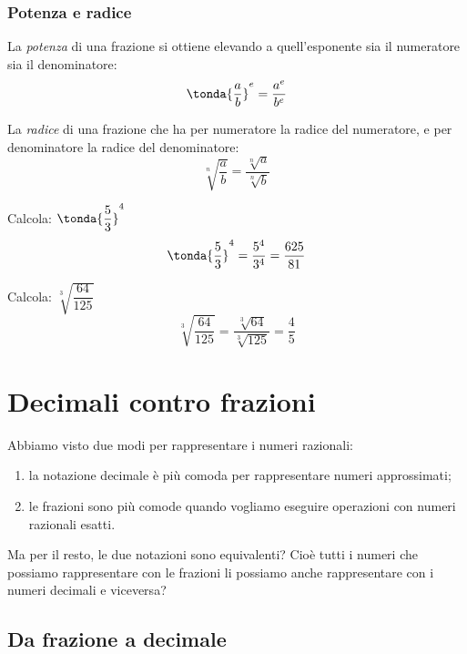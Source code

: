 \subsubsection{Potenza e radice}

\begin{definizione}
 La \emph{potenza} di una frazione si ottiene elevando a quell'esponente
sia il numeratore sia il denominatore:
\[\tonda{\dfrac{a}{b}}^e = \dfrac{a^e}{b^e}\]
\end{definizione}

\begin{definizione}
 La \emph{radice} di una frazione che ha per numeratore la radice del
numeratore, e per denominatore la radice del denominatore:
\[\sqrt[n]{\dfrac{a}{b}} = \dfrac{\sqrt[n]{a}}{\sqrt[n]{b}}\]
\end{definizione}

\begin{esempio}
Calcola: \(\tonda{\dfrac{5}{3}}^4\)
\[\tonda{\dfrac{5}{3}}^4 = \dfrac{5^4}{3^4} = \dfrac{625}{81}\]
\end{esempio}

\begin{esempio}
Calcola: \(\sqrt[3]{\dfrac{64}{125}}\)
\[\sqrt[3]{\dfrac{64}{125}} = \dfrac{\sqrt[3]{64}}{\sqrt[3]{125}} =
\dfrac{4}{5}\]
\end{esempio}

\section{Decimali contro frazioni}
\label{sec:razionali_decimali_frazioni}

Abbiamo visto due modi per rappresentare i numeri razionali:
\begin{enumerate}
 \item la notazione decimale è più comoda per rappresentare numeri
approssimati;
 \item le frazioni sono più comode quando vogliamo eseguire operazioni con
numeri razionali esatti.
\end{enumerate}

Ma per il resto, le due notazioni sono equivalenti? Cioè tutti i numeri che
possiamo rappresentare con le frazioni li possiamo anche rappresentare con
i numeri decimali e viceversa?

\subsection{Da frazione a decimale}

